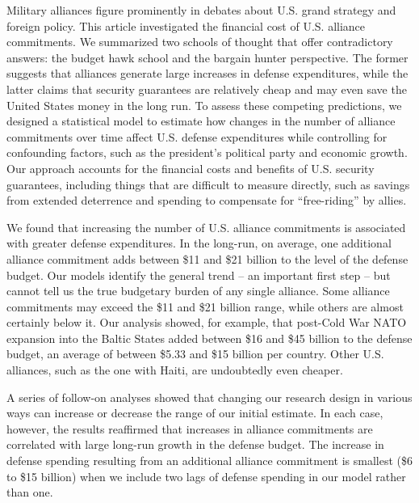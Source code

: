 Military alliances figure prominently in debates about U.S. grand strategy and foreign policy. This article investigated the financial cost of U.S. alliance commitments. We summarized two schools of thought that offer contradictory answers: the budget hawk school and the bargain hunter perspective. The former suggests that alliances generate large increases in defense expenditures, while the latter claims that security guarantees are relatively cheap and may even save the United States money in the long run. To assess these competing predictions, we designed a statistical model to estimate how changes in the number of alliance commitments over time affect U.S. defense expenditures while controlling for confounding factors, such as the president's political party and economic growth. Our approach accounts for the financial costs and benefits of U.S. security guarantees, including things that are difficult to measure directly, such as savings from extended deterrence and spending to compensate for ``free-riding'' by allies. 

We found that increasing the number of U.S. alliance commitments is associated with greater defense expenditures. In the long-run, on average, one additional alliance commitment adds between \$11 and \$21 billion to the level of the defense budget. Our models identify the general trend -- an important first step -- but cannot tell us the true budgetary burden of any single alliance. Some alliance commitments may exceed the \$11 and \$21 billion range, while others are almost certainly below it. Our analysis showed, for example, that post-Cold War NATO expansion into the Baltic States added between \$16 and \$45 billion to the defense budget, an average of between \$5.33 and \$15 billion per country. Other U.S. alliances, such as the one with Haiti, are undoubtedly even cheaper. 

A series of follow-on analyses showed that changing our research design in various ways can increase or decrease the range of our initial estimate. In each case, however, the results reaffirmed that increases in alliance commitments are correlated with large long-run growth in the defense budget. The increase in defense spending resulting from an additional alliance commitment is smallest (\$6 to \$15 billion) when we include two lags of defense spending in our model rather than one. 

